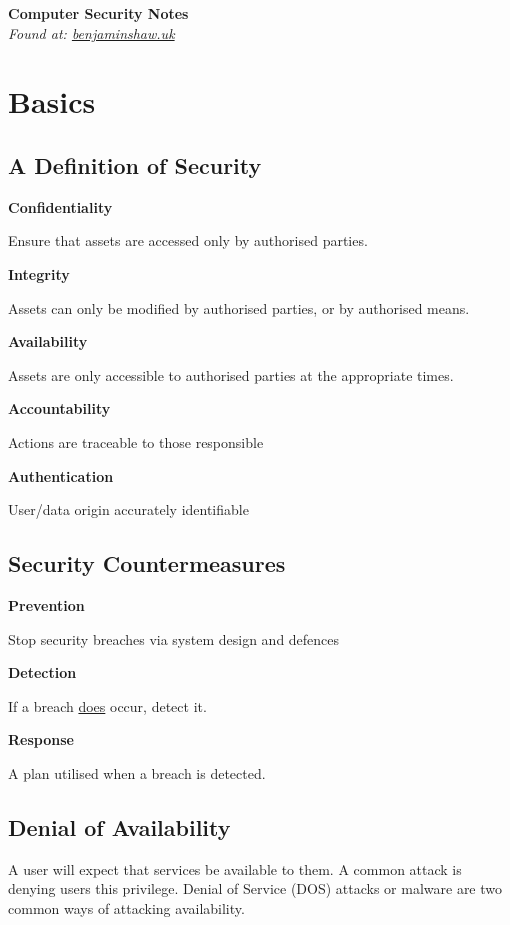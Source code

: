 \documentclass{article}
\begin{document}
\pagestyle{headings}

\textbf{\Huge Computer Security Notes}\\
\textit{\footnotesize Found at: \href{http://benjaminshaw.uk}{benjaminshaw.uk}}

\section{Basics}

\subsection{A Definition of Security}

\textbf{Confidentiality}

Ensure that assets are accessed only by authorised parties.

\textbf{Integrity}

Assets can only be modified by authorised parties, or by authorised
means.

\textbf{Availability}

Assets are only accessible to authorised parties at the appropriate
times.

\textbf{Accountability}

Actions are traceable to those responsible

\textbf{Authentication}

User/data origin accurately identifiable

\subsection{Security Countermeasures}
  
\textbf{Prevention}

Stop security breaches via system design and defences

\textbf{Detection}

If a breach \underline{does} occur, detect it.

\textbf{Response}

A plan utilised when a breach is detected.

\subsection{Denial of Availability}

A user will expect that services be available to them. A common attack
is denying users this privilege. Denial of Service (DOS) attacks or
malware are two common ways of attacking availability.
\end{document}
